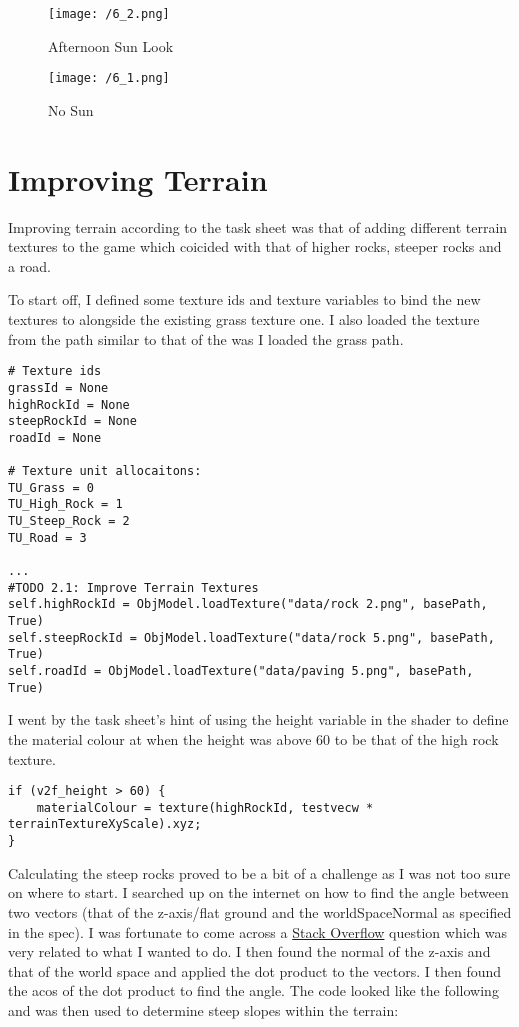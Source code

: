 \documentclass[11pt, oneside, a4paper]{article}
\begin{document}
\begin{figure}[H]
    \centering
    \begin{minipage}{0.5\textwidth}
        \centering
        \texttt{[image: /6\_2.png]}
        \caption{Afternoon Sun Look}
    \end{minipage}%
    \begin{minipage}{0.5\textwidth}
        \centering
        \texttt{[image: /6\_1.png]}
        \caption{No Sun}
    \end{minipage}
\end{figure}

\newpage
\section{Improving Terrain}
Improving terrain according to the task sheet was that of adding different terrain textures to the game which coicided with that of higher rocks, steeper rocks and a road. 

To start off, I defined some texture ids and texture variables to bind the new textures to alongside the existing grass texture one. I also loaded the texture from the path similar to that of the was I loaded the grass path.
\begin{lstlisting}
# Texture ids
grassId = None
highRockId = None
steepRockId = None
roadId = None

# Texture unit allocaitons:
TU_Grass = 0
TU_High_Rock = 1
TU_Steep_Rock = 2
TU_Road = 3

...
#TODO 2.1: Improve Terrain Textures
self.highRockId = ObjModel.loadTexture("data/rock 2.png", basePath, True)
self.steepRockId = ObjModel.loadTexture("data/rock 5.png", basePath, True)
self.roadId = ObjModel.loadTexture("data/paving 5.png", basePath, True)
\end{lstlisting}

I went by the task sheet's hint of using the height variable in the shader to define the material colour at when the height was above 60 to be that of the high rock texture.

\begin{lstlisting}
if (v2f_height > 60) {
    materialColour = texture(highRockId, testvecw * terrainTextureXyScale).xyz;
} 
\end{lstlisting}

Calculating the steep rocks proved to be a bit of a challenge as I was not too sure on where to start. I searched up on the internet on how to find the angle between two vectors (that of the  z-axis/flat ground and the worldSpaceNormal as specified in the spec). I was fortunate to come across a \href{https://stackoverflow.com/questions/41984724/calculating-angle-between-two-vectors-in-glsl}{Stack Overflow} question which was very related to what I wanted to do. I then found the normal of the z-axis and that of the world space and applied the dot product to the vectors. I then found the acos of the dot product to find the angle. The code looked like the following and was then used to determine steep slopes within the terrain:
\end{document}
